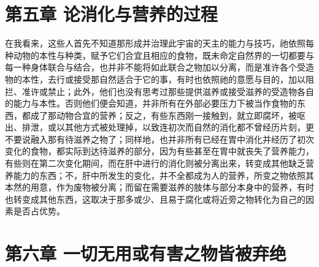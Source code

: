 
\section{第五章 论消化与营养的过程}

在我看来，这些人首先不知道那形成并治理此宇宙的天主的能力与技巧，祂依照每种动物的本性与种类，赋予它们合宜且相应的食物，既未命定自然界的一切都要与每一种身体联合与结合，也并非不能将如此联合之物加以分离，而是准许各个受造物的本性，去行或接受那自然适合于它的事，有时也依照祂的意愿与目的，加以阻拦、准许或禁止；此外，他们也没有思考过那些提供滋养或接受滋养的受造物各自的能力与本性。否则他们便会知道，并非所有在外部必要压力下被当作食物的东西，都成了那动物合宜的营养；反之，有些东西刚一接触到，就立即腐坏，被呕出、排泄，或以其他方式被处理掉，以致连初次而自然的消化都不曾经历片刻，更不要说融入那有待滋养之物了；同样地，也并非所有已经在胃中消化并经历了初次变化的食物，都实际到达待滋养的部分，因为有些甚至在胃中就丧失了营养能力，有些则在第二次变化期间，而在肝中进行的消化则被分离出来，转变成其他缺乏营养能力的东西；不，肝中所发生的变化，并不全都成为人的营养，所变之物依照其本然的用意，作为废物被分离；而留在需要滋养的肢体与部分本身中的营养，有时也转变成其他东西，这取决于那多或少、且易于腐化或将近旁之物转化为自己的因素是否占优势。\par


\section{第六章 一切无用或有害之物皆被弃绝}

